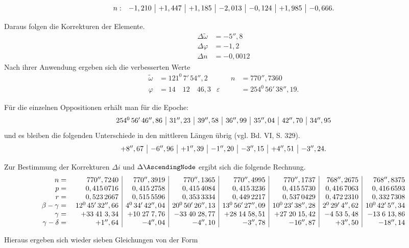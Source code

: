 \begin{landscape}
\[\begin{array}{@{}r r|r|r|r|r|r|r@{}}
n:&-1,210&+1,447&+1,185&-2,013&-0,124&+1,985&-0,666.
\end{array}\]
\par
Daraus folgen die Korrekturen der Elemente.
\[\begin{aligned}
\Delta\tilde\omega&=-5'',8\\
\Delta\varphi&=-1,2\\
\Delta n&=-0,0012
\end{aligned}\]
Nach ihrer Anwendung ergeben sich die verbesserten Werte
\[\begin{aligned}
\tilde\omega&=121^0\,7'\,54'',2&\qquad n&=770'',7360\\
\varphi&=14\quad12\quad46,3&\varepsilon&=254^0\,56'\,38'',19.
\end{aligned}\]
\par
Für die einzelnen Oppositionen erhält man für die Epoche:
\[\begin{array}{@{}r|r|r|r|r|r|r@{}}
254^0\,56'\,46'',86&31'',23&39'',58&36'',99&35'',04&42'',70&34'',95
\end{array}\]
\noindent und es bleiben die folgenden Unterschiede in den mittleren Längen übrig (vgl. Bd. VI, S. 329).
\[\begin{array}{@{}r|r|r|r|r|r|r@{}}
+8'',67&-6'',96&+1'',39&-1'',20&-3'',15&+4'',51&-3'',24.
\end{array}\]
\par
Zur Bestimmung der Korrekturen \(\Delta i\) und \(\Delta\AscendingNode\) ergibt sich die folgende Rechnung.
\begingroup\small
\[\begin{array}{@{}r r|r|r|r|r|r|r@{}}
n={}&770'',7240&770'',3919&770'',1365&770'',4995&770'',1737&768'',2675&768'',8375\\
p={}&0,415\,0716&0,415\,2758&0,415\,4084&0,415\,3236&0,415\,5730&0,416\,7063&0,416\,6593\\
r={}&0,523\,2667&0,515\,5596&0,353\,3334&0,449\,2217&0,537\,0429&0,472\,2310&0,332\,7308\\
\beta-\gamma={}&12^0\,45'\,32'',66&4^0\,34'\,42'',04&20^0\,50'\,26'',13&13^0\,56'\,27'',09&10^0\,23'\,38'',28&2^0\,29'\,4'',62&10^0\,42'\,5'',34\\
\gamma={}&+33\;41\;3,34&+10\;27\;7,76&-33\;40\;28,77&+28\;14\;58,51&+27\;20\;15,42&-4\;53\;5,48&-13\;6\;13,86\\
\gamma-\delta={}&+1'',64&-4'',04&-4'',10&-3'',78&-16'',87&+3'',50&-18'',14
\end{array}\]
\endgroup
\par
Hieraus ergeben sich wieder sieben Gleichungen \IVtwoBeforeVon von der Form

\end{landscape}
